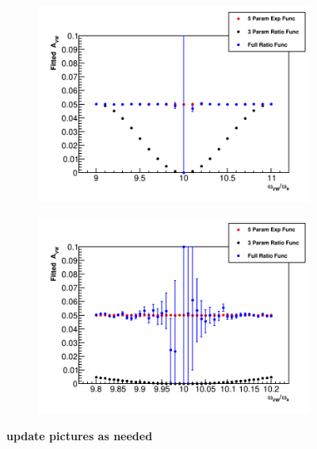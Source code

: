 \documentclass[12pt,letterpaper]{report}
\begin{document}
\begin{figure}[]
\centering
    \begin{subfigure}[]{0.46\textwidth}
        \centering
        \includegraphics[width=\textwidth]{Fitted_Avw_Vs_Wvw-9x-10x}
        \caption{}
    \end{subfigure}%
    \hspace{1cm}
    \begin{subfigure}[]{0.46\textwidth}
        \centering
        \includegraphics[width=\textwidth]{Fitted_Avw_Vs_Wvw-10x}
        \caption{}
    \end{subfigure}
\caption[]{\textbf{update pictures as needed}}
\label{fig:}
\end{figure}
\end{document}
